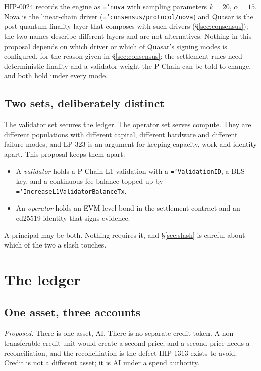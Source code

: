 \documentclass[11pt,a4paper]{article}
\newcommand{\code}[1]{\texttt{\hyphenchar\font=`\-\relax #1}}
\begin{document}
HIP-0024 records the engine as \code{nova} with sampling parameters
$k = 20$, $\alpha = 15$. Nova is the linear-chain driver
(\code{consensus/protocol/nova}) and Quasar is the post-quantum finality layer
that composes with such drivers (§\ref{sec:consensus}); the two names describe
different layers and are not alternatives. Nothing in this proposal depends on
which driver or which of Quasar's signing modes is configured, for the reason
given in §\ref{sec:consensus}: the settlement rules need deterministic finality and a validator
weight the P-Chain can be told to change, and both hold under every mode.

\subsection{Two sets, deliberately distinct}

The validator set secures the ledger. The operator set serves compute. They are
different populations with different capital, different hardware and different
failure modes, and LP-323 is an argument for keeping capacity, work and identity
apart. This proposal keeps them apart:

\begin{itemize}
  \item A \emph{validator} holds a P-Chain L1 validation with a
    \code{ValidationID}, a BLS key, and a continuous-fee balance topped up by
    \code{IncreaseL1ValidatorBalanceTx}.
  \item An \emph{operator} holds an EVM-level bond in the settlement contract
    and an ed25519 identity that signs evidence.
\end{itemize}

A principal may be both. Nothing requires it, and §\ref{sec:slash} is careful
about which of the two a slash touches.

\section{The ledger}
\label{sec:ledger}

\subsection{One asset, three accounts}

\emph{Proposed.} There is one asset, AI. There is no separate credit token. A
non-transferable credit unit would create a second price, and a second price
needs a reconciliation, and the reconciliation is the defect HIP-1313 exists to
avoid. Credit is not a different asset; it is AI under a spend authority.
\end{document}
